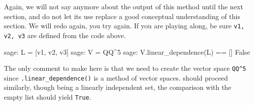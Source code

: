 %
Again, we will not say anymore about the output of this method until the next section, and do not let its use replace a good conceptual understanding of this section.  We will redo  again, you try  again.  If you are playing along, be sure \verb?v1, v2, v3? are defined from the code above.
%
\begin{sageexample}
sage: L = [v1, v2, v3]
sage: V = QQ^5
sage: V.linear_dependence(L) == []
False
\end{sageexample}
%
The only comment to make here is that we need to create the vector space \verb?QQ^5? since \verb?.linear_dependence()? is a method of vector spaces.   should proceed similarly, though being a linearly independent set, the comparison with the empty list should yield \verb?True?.
%
\begin{sageverbatim}
\end{sageverbatim}
%
